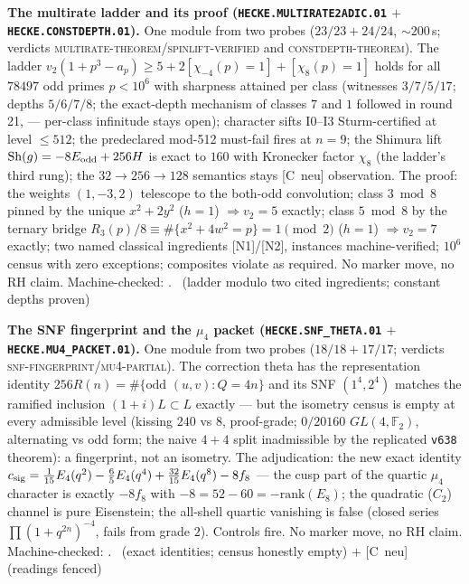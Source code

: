 \documentclass[11pt,a4paper]{article}
\theoremstyle{definition}
\begin{document}
\par\smallskip\noindent\textbf{The multirate ladder and its proof
(\texttt{HECKE.MULTIRATE2ADIC.01} $+$
\texttt{HECKE.CONSTDEPTH.01}).}
One module from two probes ($23/23+24/24$, ${\sim}200$\,s; verdicts
\textsc{multirate-theorem}/\textsc{spinlift-verified} and
\textsc{constdepth-theorem}).  The ladder
$v_2(1{+}p^3{-}a_p)\ge5+2[\chi_{-4}(p){=}1]+[\chi_8(p){=}1]$ holds
for all $78497$ odd primes $p<10^6$ with sharpness attained per
class (witnesses $3/7/5/17$; depths $5/6/7/8$; the exact-depth
mechanism of classes $7$ and $1$ followed in round 21,
 --- per-class infinitude stays
open); character sifts
I0--I3 Sturm-certified at level $\le512$; the predeclared mod-512
must-fail fires at $n=9$; the Shimura lift
$\mathrm{Sh}(g)=-8E_{\rm odd}+256H$ is exact to $160$ with
Kronecker factor $\chi_8$ (the ladder's third rung); the
$32\to256\to128$ semantics stays [C~neu] observation.  The proof:
the weights $(1,-3,2)$ telescope to the both-odd convolution;
class $3\bmod8$ pinned by the unique $x^2+2y^2$ ($h=1$)
$\Rightarrow v_2=5$ exactly; class $5\bmod8$ by the ternary bridge
$R_3(p)/8\equiv\#\{x^2+4w^2=p\}=1\pmod2$ ($h=1$)
$\Rightarrow v_2=7$ exactly; two named classical ingredients
[N1]/[N2], instances machine-verified; $10^6$ census with zero
exceptions; composites violate as required.  No marker move, no RH
claim.
Machine-checked: .
\mE\ (ladder modulo two cited ingredients; constant depths proven)
\par\smallskip

\par\smallskip\noindent\textbf{The SNF fingerprint and the $\mu_4$
packet (\texttt{HECKE.SNF\_THETA.01} $+$
\texttt{HECKE.MU4\_PACKET.01}).}
One module from two probes ($18/18+17/17$; verdicts
\textsc{snf-fingerprint}/\textsc{mu4-partial}).  The correction
theta has the representation identity
$256R(n)=\#\{\text{odd }(u,v):Q=4n\}$ and its SNF $(1^4,2^4)$
matches the ramified inclusion $(1{+}i)L\subset L$ exactly --- but
the isometry census is empty at every admissible level (kissing
$240$ vs $8$, proof-grade; $0/20160$ $GL(4,\mathbb F_2)$,
alternating vs odd form; the naive $4{+}4$ split inadmissible by
the replicated \texttt{v638} theorem): a fingerprint, not an
isometry.  The adjudication: the new exact identity
$c_{\rm sig}=\tfrac1{15}E_4(q^2)-\tfrac65E_4(q^4)
+\tfrac{32}{15}E_4(q^8)-8f_8$ --- the cusp part of the quartic
$\mu_4$ character is exactly $-8f_8$ with $-8=52-60=
-\mathrm{rank}(E_8)$; the quadratic ($C_2$) channel is pure
Eisenstein; the all-shell quartic vanishing is false (closed
series $\prod(1{+}q^{2n})^{-4}$, fails from grade $2$).  Controls
fire.  No marker move, no RH claim.
Machine-checked: .
\mE\ (exact identities; census honestly empty) $+$ [C~neu]
(readings fenced)
\par\smallskip
\end{document}

